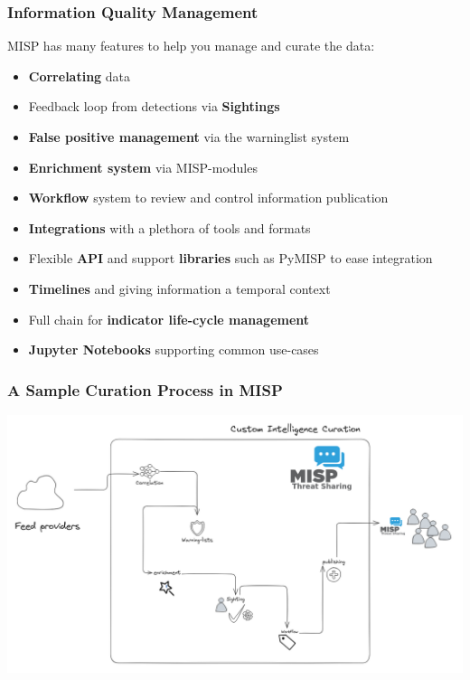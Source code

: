 \begin{frame}
    \frametitle{Information Quality Management}
    MISP has many features to help you manage and curate the data:
    \begin{itemize}
        \item \textbf{Correlating} data
        \item Feedback loop from detections via {\bf Sightings}
        \item {\bf False positive management} via the warninglist system
        \item {\bf Enrichment system} via MISP-modules
        \item {\bf Workflow} system to review and control information publication
        \item {\bf Integrations} with a plethora of tools and formats
        \item Flexible {\bf API} and support {\bf libraries} such as PyMISP to ease integration
        \item {\bf Timelines} and giving information a temporal context
        \item Full chain for {\bf indicator life-cycle management}
        \item {\bf Jupyter Notebooks} supporting common use-cases
    \end{itemize}
\end{frame}

\begin{frame}
    \frametitle{A Sample Curation Process in MISP}
    \begin{center}
        \includegraphics[width=0.84\linewidth]{curation.png}
    \end{center}
\end{frame}

